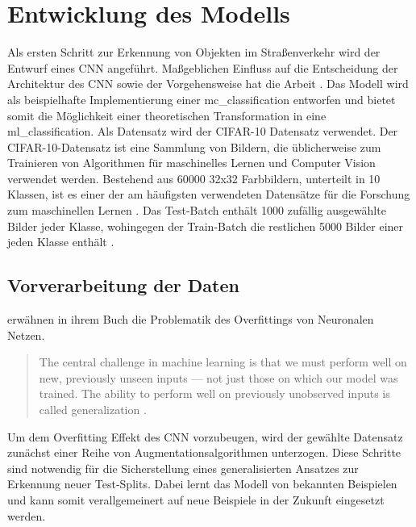 \chapter{Entwicklung des Modells}

Als ersten Schritt zur Erkennung von Objekten im Straßenverkehr wird der Entwurf eines \ac{CNN} angeführt. Maßgeblichen Einfluss auf die Entscheidung der Architektur des \ac{CNN} sowie der Vorgehensweise hat die Arbeit  \cite{rock_paper_scissors}. Das Modell wird als beispielhafte Implementierung einer \gls{mc_classification} entworfen und bietet somit die Möglichkeit einer theoretischen Transformation in eine \gls{ml_classification}. Als Datensatz wird der \ac{CIFAR}-10 Datensatz verwendet. Der \acs{CIFAR}-10-Datensatz ist eine Sammlung von Bildern, die üblicherweise zum Trainieren von Algorithmen für maschinelles Lernen und Computer Vision verwendet werden. Bestehend aus 60000 32x32 Farbbildern, unterteilt in 10 Klassen, ist es einer der am häufigsten verwendeten Datensätze für die Forschung zum maschinellen Lernen \cites{most_used_datasets_2}{most_used_datasets}. Das Test-Batch enthält 1000 zufällig ausgewählte Bilder jeder Klasse, wohingegen der Train-Batch die restlichen 5000 Bilder einer jeden Klasse enthält \cites{cifar10}{cifar10_2}.

\section{Vorverarbeitung der Daten}

\citeauthor{Goodfellow2016} erwähnen in ihrem Buch  die Problematik des Overfittings von Neuronalen Netzen. 

\begin{quote}
	 The central challenge in machine learning is that we must perform well on new, previously unseen inputs — not just those on which our model was trained. The ability to perform well on previously unobserved inputs is called generalization \cite[110]{Goodfellow2016}. 
\end{quote}

Um dem Overfitting Effekt des \ac{CNN} vorzubeugen, wird der gewählte Datensatz zunächst einer Reihe von Augmentationsalgorithmen unterzogen. Diese Schritte sind notwendig für die Sicherstellung eines generalisierten Ansatzes zur Erkennung neuer Test-Splits. Dabei lernt das Modell von bekannten Beispielen und kann somit verallgemeinert auf neue Beispiele in der Zukunft eingesetzt werden. 
\newpage
